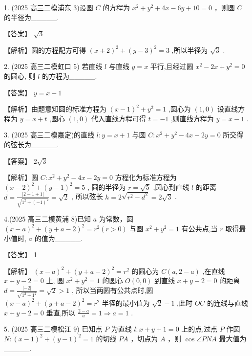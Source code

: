 \documentclass[10pt]{article}
\begin{document}
1. (2025 高三二模浦东 3)设圆 \(C\) 的方程为 \({x}^{2} + {y}^{2} + {4x} - {6y} + {10} = 0\) ，则圆 \(C\) 的半径为\_\_\_\_\_.

【答案】 \(\sqrt{3}\)

【解析】圆的方程配方可得 \({\left( x + 2\right) }^{2} + {\left( y - 3\right) }^{2} = 3\) ,所以半径为 \(\sqrt{3}\) .

2. (2025 高三二模虹口 5) 若直线 \(l\) 与直线 \(y = x\) 平行,且经过圆 \({x}^{2} - {2x} + {y}^{2} = 0\) 的圆心, 则 \(l\) 的方程为\_\_\_\_\_.

【答案】 \(y = x - 1\)

【解析】由题意知圆的标准方程为 \({\left( x - 1\right) }^{2} + {y}^{2} = 1\) ,圆心为 \(\left( {1,0}\right)\) 设直线方程为 \(y = x + t\) ,圆心 \(\left( {1,0}\right)\) 代入直线方程可得 \(t =  - 1\) ,则直线方程为 \(y = x - 1\) .

3. (2025 高三二模嘉定)的直线 \(l : y = x + 1\) 与圆 \(C : {x}^{2} + {y}^{2} - {4x} - {2y} = 0\) 所交得的弦长为\_\_\_\_\_.

【答案】 \(2\sqrt{3}\)

【解析】圆 \(C : {x}^{2} + {y}^{2} - {4x} - {2y} = 0\) 方程化为标准方程为 \({\left( x - 2\right) }^{2} + {\left( y - 1\right) }^{2} = 5\) , 圆的半径为 \(r = \sqrt{5}\) ,圆心到直线 \(l\) 的距离 \(d = \frac{\left| 2 - 1 + 1\right| }{\sqrt{{1}^{2} + {\left( -1\right) }^{2}}} = \sqrt{2}\) , 所以弦长 \(h = 2\sqrt{{r}^{2} - {d}^{2}} = 2\sqrt{3}\) .

4.(2025 高三二模黄浦 8)已知 \(a\) 为常数，圆 \({\left( x - a\right) }^{2} + {\left( y + a - 2\right) }^{2} = {r}^{2}\left( {r > 0}\right)\) 与圆 \({x}^{2} + {y}^{2} = 1\) 有公共点,当 \(r\) 取得最小值时, \(a\) 的值为\_\_\_\_\_.

【答案】 1

【解析】 \({\left( x - a\right) }^{2} + {\left( y + a - 2\right) }^{2} = {r}^{2}\) 的圆心为 \(C\left( {a,2 - a}\right)\) ,在直线 \(x + y - 2 = 0\) 上, 圆 \({x}^{2} + {y}^{2} = 1\) 的圆心 \(O\left( {0,0}\right)\) 到直线 \(x + y - 2 = 0\) 的距离 \(d = \frac{\left| -2\right| }{\sqrt{{1}^{2} + {1}^{2}}} = \sqrt{2} > 1\) , 所以当两圆有公共点时,圆 \({\left( x - a\right) }^{2} + {\left( y + a - 2\right) }^{2} = {r}^{2}\) 半径的最小值为 \(\sqrt{2} - 1\) ,此时 \({OC}\) 的连线与直线 \(x + y - 2 = 0\) 垂直,所以 \(\frac{2 - a}{a} = 1 \Rightarrow  a = 1\) .

5. (2025 高三二模松江 9) 已知点 \(P\) 为直线 \(l : x + y + 1 = 0\) 上的点,过点 \(P\) 作圆 \(N : {\left( x - 1\right) }^{2} + {\left( y - 1\right) }^{2} = 1\) 的切线 \({PA}\) ，切点为 \(A\) ，则 \(\cos \angle {PNA}\) 最大值为\_\_\_\_\_.
\end{document}
